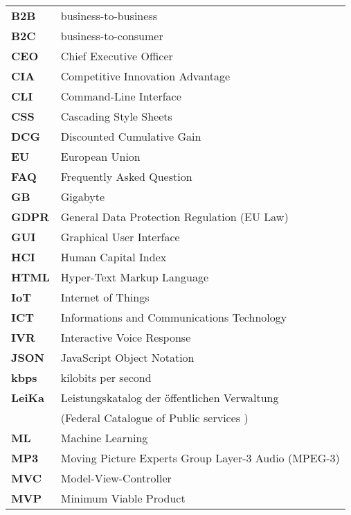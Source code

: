 \begin{flushleft}
\begin{tabular}{ll}
\textbf{B2B}	&	business-to-business\\
\textbf{B2C}	&	business-to-consumer\\

\textbf{CEO}	&	Chief Executive Officer\\
\textbf{CIA}	&	Competitive Innovation Advantage\\
\textbf{CLI}	&	Command-Line Interface\\
\textbf{CSS}	&	Cascading Style Sheets\\

\textbf{DCG}	&	Discounted Cumulative Gain\\

\textbf{EU}		&	European Union\\


\textbf{FAQ}	&	Frequently Asked Question\\

\textbf{GB}		&	Gigabyte\\
\textbf{GDPR}	&	General Data Protection Regulation (EU Law)\\
\textbf{GUI}	&	Graphical User Interface\\

\textbf{HCI}	&	Human Capital Index\\
\textbf{HTML}	&	Hyper-Text Markup Language\\

\textbf{IoT}	&	Internet of Things\\
\textbf{ICT}	&	Informations and Communications Technology\\

\textbf{IVR}	&	Interactive Voice Response\\

\textbf{JSON}	&	JavaScript Object Notation\\

\textbf{kbps}	&	kilobits per second\\

\textbf{LeiKa}	&	Leistungskatalog der öffentlichen Verwaltung \\
& (Federal Catalogue of Public %
services )\\


\textbf{ML}		&	Machine Learning\\
\textbf{MP3}	&	Moving Picture Experts Group Layer-3 Audio (MPEG-3)\\
\textbf{MVC}	&	Model-View-Controller\\
\textbf{MVP}	&	Minimum Viable Product\\


\end{tabular}
\end{flushleft}
